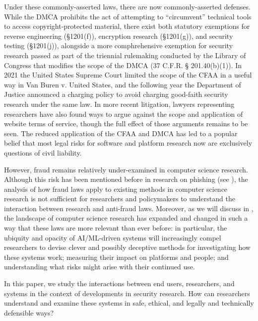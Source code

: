 Under these commonly-asserted laws, there are now commonly-asserted defenses. While the DMCA prohibits the act of attempting to ``circumvent'' technical tools to access copyright-protected material, there exist both statutory exemptions for reverse engineering (§1201(f)), encryption research (§1201(g)), and security testing (§1201(j)), alongside a more comphrehensive exemption for security research passed as part of the triennial rulemaking conducted by the Library of Congress that modifies the scope of the DMCA (37 C.F.R. § 201.40(b)(1)). In 2021 the United States Supreme Court limited the scope of the CFAA in a useful way in Van Buren v. United States, and the following year the Department of Justice announced a charging policy to avoid charging good-faith security research under the same law. \cite{vanBuren2021, OfficePublicAffairs2022} In more recent litigation, lawyers representing researchers have also found ways to argue against the scope and application of website terms of service, though the full effect of those arguments remains to be seen. 
The reduced application of the CFAA and DMCA has led to a popular belief that most legal risks for software and platform research now are exclusively questions of civil liability.


However, fraud remains relatively under-examined in computer science research.
Although this risk has been mentioned before in research on phishing (see ), the analysis of how fraud laws apply to existing methods in computer science research is not sufficient for researchers and policymakers to understand the interaction between research and anti-fraud laws. Moreover, as we will discuss in , the landscape of computer science research has expanded and changed in such a way that these laws are more relevant than ever before: in particular, the ubiquity and opacity of AI/ML-driven systems will increasingly compel researchers to devise clever and possibly deceptive methods for investigating how these systems work; measuring their impact on platforms and people; and understanding what risks might arise with their continued use. 

In this paper, we study the interactions between end users, researchers, and systems in the context of developments in security research. How can researchers understand and examine these systems in safe, ethical, and legally and technically defensible ways?  